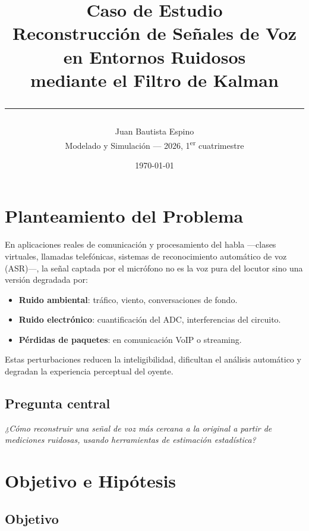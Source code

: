 \documentclass[12pt,a4paper]{article}
\title{
  \vspace{-1cm}
  {\Large \textbf{Caso de Estudio}} \\[0.4em]
  {\LARGE Reconstrucción de Señales de Voz en Entornos Ruidosos} \\[0.3em]
  {\large mediante el Filtro de Kalman} \\[0.5em]
  \hrule
}
\author{Juan Bautista Espino \\[0.2em]
  \small Modelado y Simulación --- 2026, 1\textsuperscript{er} cuatrimestre}
\date{\today}
\begin{document}
\maketitle
\tableofcontents
\newpage

\section{Planteamiento del Problema}

En aplicaciones reales de comunicación y procesamiento del habla —clases virtuales,
llamadas telefónicas, sistemas de reconocimiento automático de voz (ASR)—, la señal
captada por el micrófono no es la voz pura del locutor sino una versión degradada por:

\begin{itemize}[leftmargin=1.5cm]
  \item \textbf{Ruido ambiental}: tráfico, viento, conversaciones de fondo.
  \item \textbf{Ruido electrónico}: cuantificación del ADC, interferencias del circuito.
  \item \textbf{Pérdidas de paquetes}: en comunicación VoIP o streaming.
\end{itemize}

Estas perturbaciones reducen la inteligibilidad, dificultan el análisis automático y
degradan la experiencia perceptual del oyente.

\subsection*{Pregunta central}

\begin{center}
\textit{¿Cómo reconstruir una señal de voz más cercana a la original
a partir de mediciones ruidosas, usando herramientas de estimación estadística?}
\end{center}

\section{Objetivo e Hipótesis}

\subsection{Objetivo}
\end{document}

